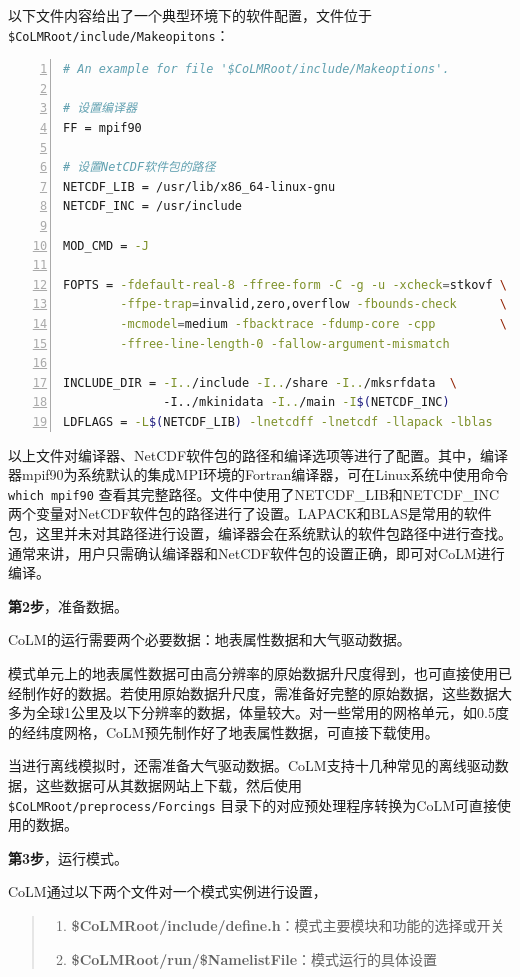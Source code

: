 \documentclass[a4paper,12pt,twoside]{article}
\begin{document}
以下文件内容给出了一个典型环境下的软件配置，文件位于\texttt{\$CoLMRoot/include/\allowbreak Makeopitons}：
\begin{lstlisting}[language=bash, basicstyle=\linespread{1.2}\footnotesize\ttfamily, commentstyle=\color{olive}, numbers=left, numberstyle=\tiny, xleftmargin=1.5em,xrightmargin=0em, aboveskip=1em]
# An example for file '$CoLMRoot/include/Makeoptions'.

# 设置编译器
FF = mpif90

# 设置NetCDF软件包的路径
NETCDF_LIB = /usr/lib/x86_64-linux-gnu
NETCDF_INC = /usr/include

MOD_CMD = -J

FOPTS = -fdefault-real-8 -ffree-form -C -g -u -xcheck=stkovf \
        -ffpe-trap=invalid,zero,overflow -fbounds-check      \
        -mcmodel=medium -fbacktrace -fdump-core -cpp         \
        -ffree-line-length-0 -fallow-argument-mismatch

INCLUDE_DIR = -I../include -I../share -I../mksrfdata  \ 
              -I../mkinidata -I../main -I$(NETCDF_INC)
LDFLAGS = -L$(NETCDF_LIB) -lnetcdff -lnetcdf -llapack -lblas

\end{lstlisting}

以上文件对编译器、NetCDF软件包的路径和编译选项等进行了配置。其中，编译器mpif90为系统默认的集成MPI环境的Fortran编译器，可在Linux系统中使用命令 \texttt{which mpif90} 查看其完整路径。文件中使用了NETCDF\_LIB和NETCDF\_INC两个变量对NetCDF软件包的路径进行了设置。LAPACK和BLAS是常用的软件包，这里并未对其路径进行设置，编译器会在系统默认的软件包路径中进行查找。通常来讲，用户只需确认编译器和NetCDF软件包的设置正确，即可对CoLM进行编译。

\textbf{第2步}，准备数据。

CoLM的运行需要两个必要数据：地表属性数据和大气驱动数据。

模式单元上的地表属性数据可由高分辨率的原始数据升尺度得到，也可直接使用已经制作好的数据。若使用原始数据升尺度，需准备好完整的原始数据，这些数据大多为全球1公里及以下分辨率的数据，体量较大。对一些常用的网格单元，如0.5度的经纬度网格，CoLM预先制作好了地表属性数据，可直接下载使用。

当进行离线模拟时，还需准备大气驱动数据。CoLM支持十几种常见的离线驱动数据，这些数据可从其数据网站上下载，然后使用 \texttt{\$CoLMRoot/preprocess/Forcings} 目录下的对应预处理程序转换为CoLM可直接使用的数据。

\textbf{第3步}，运行模式。

CoLM通过以下两个文件对一个模式实例进行设置，
\begin{quote}
\begin{enumerate}[label=\arabic*)]
    \item \textbf{\$CoLMRoot/include/define.h}：模式主要模块和功能的选择或开关
    \item \textbf{\$CoLMRoot/run/\$NamelistFile}：模式运行的具体设置
\end{enumerate}
\end{quote}
\end{document}
